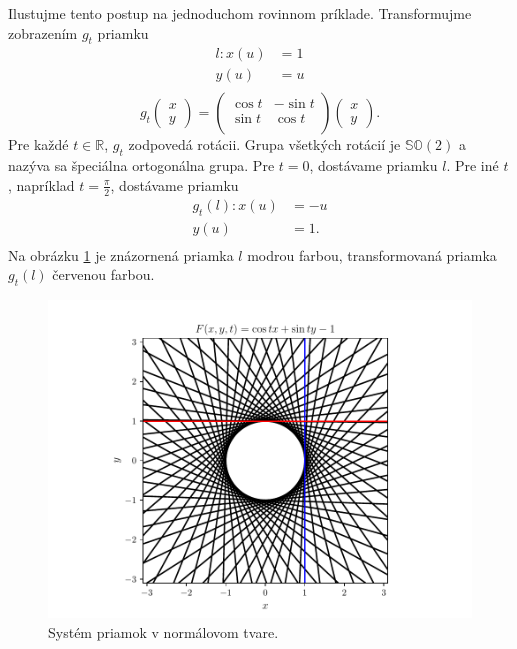 \begin{example}
Ilustujme tento postup na jednoduchom rovinnom príklade. Transformujme zobrazením $g_t$ priamku
\begin{align*}
l \colon x(u) &= 1 \\
y(u) &= u \\
\end{align*}
\[
g_t \begin{pmatrix} x \\ y \end{pmatrix} = \begin{pmatrix}
\cos t & -\sin t  \\
\sin t & \cos t  \\
\end{pmatrix}
\begin{pmatrix} x \\ y \end{pmatrix}.
\]
Pre každé $t \in \mathbb{R}$, $g_t$ zodpovedá rotácii. Grupa všetkých rotácií je $\mathbb{SO}(2)$ a nazýva sa špeciálna ortogonálna grupa. Pre $t = 0$, dostávame priamku $l$. Pre iné $t$, napríklad $t = \frac{\pi}{2}$, dostávame priamku
\begin{align*}
g_t(l) \colon x(u) &= -u \\
y(u) &= 1. \\
\end{align*}
Na obrázku \ref{fig:lines_in_normal_form} je znázornená priamka $l$ modrou farbou, transformovaná priamka $g_t(l)$ červenou farbou.

\begin{figure}[H]
	\centering
	\includegraphics{images/lines_in_normal_form.pdf}
	\caption{Systém priamok v normálovom tvare.}
	\label{fig:lines_in_normal_form}
\end{figure}

\end{example}

